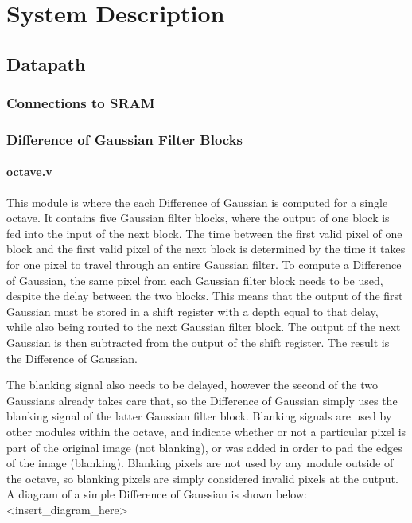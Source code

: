 \documentclass[12pt]{article}
\begin{document}
\section{System Description}

\subsection{Datapath}

\subsubsection{Connections to SRAM}

\subsubsection{Difference of Gaussian Filter Blocks}

\paragraph{octave.v}

This module is where the each Difference of Gaussian is computed for a single 
octave. It contains five Gaussian filter blocks, where the output of one block 
is fed into the input of the next block. The time between the first valid pixel 
of one block and the first valid pixel of the next block is determined by the 
time it takes for one pixel to travel through an entire Gaussian filter. To 
compute a Difference of Gaussian, the same pixel from each Gaussian filter block 
needs to be used, despite the delay between the two blocks. This means that the 
output of the first Gaussian must be stored in a shift register with a depth 
equal to that delay, while also being routed to the next Gaussian filter block. 
The output of the next Gaussian is then subtracted from the output of the shift 
register. The result is the Difference of Gaussian.

The blanking signal also needs to be delayed, however the second of the two 
Gaussians already takes care that, so the Difference of Gaussian simply uses the 
blanking signal of the latter Gaussian filter block. Blanking signals are used 
by other modules within the octave, and indicate whether or not a particular 
pixel is part of the original image (not blanking), or was added in order to pad 
the edges of the image (blanking). Blanking pixels are not used by any module 
outside of the octave, so blanking pixels are simply considered invalid pixels 
at the output. A diagram of a simple Difference of Gaussian is shown below: 
<insert\_diagram\_here>
\end{document}
